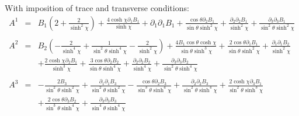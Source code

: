 \documentclass[10pt,letterpaper]{article}
\numberwithin{equation}{section}
\begin{document}
With imposition of trace and transverse conditions:
\begin{eqnarray}
A^1&=& B_{1} \left(2 + \frac{2}{\sinh^2\chi}\right) + \frac{4 \cosh\chi \partial_{1}B_{1}}{\sinh\chi} + \partial_{1}\partial_{1}B_{1} + \frac{\cos\theta \partial_{2}B_{1}}{\sin\theta \sinh^2\chi} + \frac{\partial_{2}\partial_{2}B_{1}}{\sinh^2\chi} + \frac{\partial_{3}\partial_{3}B_{1}}{\sin^2\theta \sinh^2\chi}
\\  \nonumber\\ 
A^2&=& B_{2} \left(- \frac{2}{\sinh^4\chi} + \frac{1}{\sin^2\theta \sinh^4\chi} -  \frac{2}{\sinh^2\chi}\right) + \frac{4 B_{1} \cos\theta \cosh\chi}{\sin\theta \sinh^3\chi} + \frac{2 \cos\theta \partial_{1}B_{1}}{\sin\theta \sinh^2\chi} + \frac{\partial_{1}\partial_{1}B_{2}}{\sinh^2\chi} \nonumber \\ 
&& + \frac{2 \cosh\chi \partial_{2}B_{1}}{\sinh^3\chi} + \frac{3 \cos\theta \partial_{2}B_{2}}{\sin\theta \sinh^4\chi} + \frac{\partial_{2}\partial_{2}B_{2}}{\sinh^4\chi} + \frac{\partial_{3}\partial_{3}B_{2}}{\sin^2\theta \sinh^4\chi}
\\  \nonumber\\ 
A^3&=& - \frac{2 B_{3}}{\sin^2\theta \sinh^2\chi} + \frac{\partial_{1}\partial_{1}B_{3}}{\sin^2\theta \sinh^2\chi} -  \frac{\cos\theta \partial_{2}B_{3}}{\sin^3\theta \sinh^4\chi} + \frac{\partial_{2}\partial_{2}B_{3}}{\sin^2\theta \sinh^4\chi} + \frac{2 \cosh\chi \partial_{3}B_{1}}{\sin^2\theta \sinh^3\chi} \nonumber \\ 
&& + \frac{2 \cos\theta \partial_{3}B_{2}}{\sin^3\theta \sinh^4\chi} + \frac{\partial_{3}\partial_{3}B_{3}}{\sin^4\theta \sinh^4\chi}
\end{eqnarray}
\end{document}
